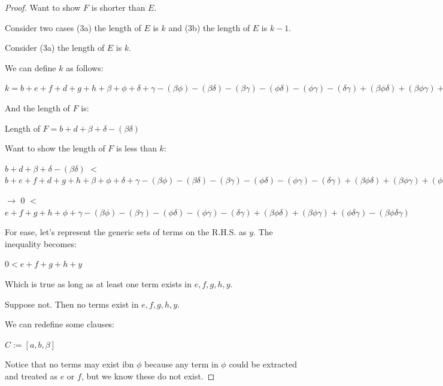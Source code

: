 \documentclass[manuscript]{acmart}
\begin{document}
\begin{proof}
        Want to show $F$ is shorter than $E$. 

        Consider two cases (3a) the length of $E$ is $k$ and (3b) the length of $E$ is $k-1$.

        Consider (3a) the length of $E$ is $k$.

        We can define $k$ as follows:

        $k = b + e + f + d + g + h 
            + \beta + \phi + \delta + \gamma
            - (\beta \phi) - (\beta \delta) - (\beta \gamma) - (\phi \delta) - (\phi \gamma) - (\delta \gamma)
            + (\beta \phi \delta) + (\beta \phi \gamma) + (\phi \delta \gamma)
            - (\beta \phi \delta \gamma)
            $

        And the length of $F$ is:

        Length of $F = b + d + \beta + \delta - (\beta \delta)$

        Want to show the length of $F$ is less than $k$:

        $b + d + \beta + \delta - (\beta \delta)$
        $<$
        $b + e + f + d + g + h 
            + \beta + \phi + \delta + \gamma
            - (\beta \phi) - (\beta \delta) - (\beta \gamma) - (\phi \delta) - (\phi \gamma) - (\delta \gamma)
            + (\beta \phi \delta) + (\beta \phi \gamma) + (\phi \delta \gamma)
            - (\beta \phi \delta \gamma)
        $

        $\rightarrow$
        $0$
        $<$
        $e + f + g + h 
            + \phi + \gamma
            - (\beta \phi) - (\beta \gamma) - (\phi \delta) - (\phi \gamma) - (\delta \gamma)
            + (\beta \phi \delta) + (\beta \phi \gamma) + (\phi \delta \gamma)
            - (\beta \phi \delta \gamma)
        $

        For ease, let's represent the generic sets of terms on the R.H.S. as $y$. The inequality becomes:

        $0 < e + f + g + h + y$

        Which is true as long as at least one term exists in {$e, f, g, h, y$}.

        Suppose not. Then no terms exist in {$e, f, g, h, y$}.

        We can redefine some clauses: 

        $C := [a, b, \beta]$

        Notice that no terms may exist ibn $\phi$ because any term in $\phi$ could be extracted and treated as $e$ or $f$, but we know these do not exist.


\end{proof}
\end{document}
